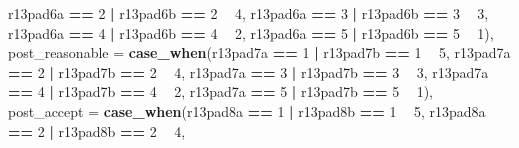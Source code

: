 \documentclass[]{book}
\newenvironment{Shaded}{\begin{snugshade}}{\end{snugshade}}
\newcommand{\KeywordTok}[1]{\textcolor[rgb]{0.13,0.29,0.53}{\textbf{#1}}}
\newcommand{\DataTypeTok}[1]{\textcolor[rgb]{0.13,0.29,0.53}{#1}}
\newcommand{\DecValTok}[1]{\textcolor[rgb]{0.00,0.00,0.81}{#1}}
\newcommand{\StringTok}[1]{\textcolor[rgb]{0.31,0.60,0.02}{#1}}
\newcommand{\OperatorTok}[1]{\textcolor[rgb]{0.81,0.36,0.00}{\textbf{#1}}}
\newcommand{\NormalTok}[1]{#1}
\begin{document}
\begin{Shaded}
\begin{Highlighting}[]
{{{{{{{\NormalTok{                          r13pad6a }\OperatorTok{==}\StringTok{ }\DecValTok{2} \OperatorTok{|}\StringTok{ }\NormalTok{r13pad6b }\OperatorTok{==}\StringTok{ }\DecValTok{2} \OperatorTok{~}\StringTok{ }\DecValTok{4}\NormalTok{,}
\NormalTok{                          r13pad6a }\OperatorTok{==}\StringTok{ }\DecValTok{3} \OperatorTok{|}\StringTok{ }\NormalTok{r13pad6b }\OperatorTok{==}\StringTok{ }\DecValTok{3} \OperatorTok{~}\StringTok{ }\DecValTok{3}\NormalTok{,}
\NormalTok{                          r13pad6a }\OperatorTok{==}\StringTok{ }\DecValTok{4} \OperatorTok{|}\StringTok{ }\NormalTok{r13pad6b }\OperatorTok{==}\StringTok{ }\DecValTok{4} \OperatorTok{~}\StringTok{ }\DecValTok{2}\NormalTok{,}
\NormalTok{                          r13pad6a }\OperatorTok{==}\StringTok{ }\DecValTok{5} \OperatorTok{|}\StringTok{ }\NormalTok{r13pad6b }\OperatorTok{==}\StringTok{ }\DecValTok{5} \OperatorTok{~}\StringTok{ }\DecValTok{1}\NormalTok{),}
          \DataTypeTok{post_reasonable =} \KeywordTok{case_when}\NormalTok{(r13pad7a }\OperatorTok{==}\StringTok{ }\DecValTok{1} \OperatorTok{|}\StringTok{ }\NormalTok{r13pad7b }\OperatorTok{==}\StringTok{ }\DecValTok{1} \OperatorTok{~}\StringTok{ }\DecValTok{5}\NormalTok{,}
\NormalTok{                          r13pad7a }\OperatorTok{==}\StringTok{ }\DecValTok{2} \OperatorTok{|}\StringTok{ }\NormalTok{r13pad7b }\OperatorTok{==}\StringTok{ }\DecValTok{2} \OperatorTok{~}\StringTok{ }\DecValTok{4}\NormalTok{,}
\NormalTok{                          r13pad7a }\OperatorTok{==}\StringTok{ }\DecValTok{3} \OperatorTok{|}\StringTok{ }\NormalTok{r13pad7b }\OperatorTok{==}\StringTok{ }\DecValTok{3} \OperatorTok{~}\StringTok{ }\DecValTok{3}\NormalTok{,}
\NormalTok{                          r13pad7a }\OperatorTok{==}\StringTok{ }\DecValTok{4} \OperatorTok{|}\StringTok{ }\NormalTok{r13pad7b }\OperatorTok{==}\StringTok{ }\DecValTok{4} \OperatorTok{~}\StringTok{ }\DecValTok{2}\NormalTok{,}
\NormalTok{                          r13pad7a }\OperatorTok{==}\StringTok{ }\DecValTok{5} \OperatorTok{|}\StringTok{ }\NormalTok{r13pad7b }\OperatorTok{==}\StringTok{ }\DecValTok{5} \OperatorTok{~}\StringTok{ }\DecValTok{1}\NormalTok{),}
          \DataTypeTok{post_accept =} \KeywordTok{case_when}\NormalTok{(r13pad8a }\OperatorTok{==}\StringTok{ }\DecValTok{1} \OperatorTok{|}\StringTok{ }\NormalTok{r13pad8b }\OperatorTok{==}\StringTok{ }\DecValTok{1} \OperatorTok{~}\StringTok{ }\DecValTok{5}\NormalTok{,}
\NormalTok{                          r13pad8a }\OperatorTok{==}\StringTok{ }\DecValTok{2} \OperatorTok{|}\StringTok{ }\NormalTok{r13pad8b }\OperatorTok{==}\StringTok{ }\DecValTok{2} \OperatorTok{~}\StringTok{ }\DecValTok{4}\NormalTok{,}
}}}}}}}
\end{Highlighting}
\end{Shaded}
\end{document}
